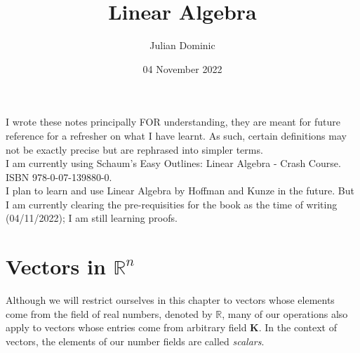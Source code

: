 \documentclass[../setup.tex]{subfiles}
\begin{document}
\title{Linear Algebra}
\author{Julian Dominic}
\date{04 November 2022}
\maketitle
\clearpage

\newcommand{\prefacename}{Preface}
\newenvironment{preface}{
    {\noindent \bfseries \Huge \prefacename}
    \begin{center}
        \thispagestyle{plain}
    \end{center}%
}



\preface
I wrote these notes principally FOR understanding, they are meant for future reference for a refresher on what I have learnt. As such, certain definitions may not be exactly precise but are rephrased into simpler terms. \\
I am currently using Schaum's Easy Outlines: Linear Algebra - Crash Course. ISBN 978-0-07-139880-0. \\
I plan to learn and use Linear Algebra by Hoffman and Kunze in the future. But I am currently clearing the pre-requisities for the book as the time of writing (04/11/2022); I am still learning proofs. \\ 

\tableofcontents
{}
\clearpage

\setcounter{page}{1}

\section{Vectors in $\mathbb{R}^n$}
Although we will restrict ourselves in this chapter to vectors whose elements come from the field of real numbers, denoted by $\mathbb{R}$, many of our operations also apply to vectors whose entries come from arbitrary field $\boldsymbol{K}$. In the context of vectors, the elements of our number fields are called \textit{scalars}. \\
\end{document}

